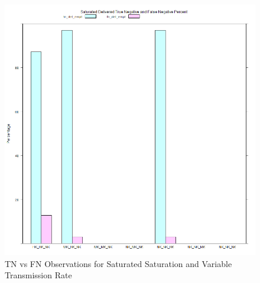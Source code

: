	\begin{figure}[H]
	\centering
	\includegraphics[width=\textwidth]{Chap7/figures/plots/saturated_variable/tnvsfn_percent.png}
	\caption{TN vs FN Observations for Saturated Saturation and Variable Transmission Rate}
	\label{fig:sim:res:sat:variable:tnfn}
	\end{figure}